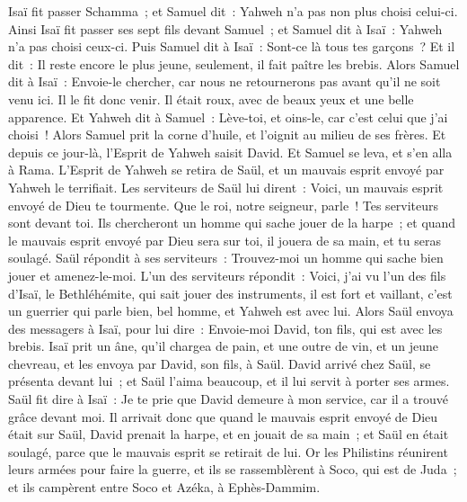 \begin{multicols}{2}
Isaï fit passer Schamma~; et Samuel dit~: Yahweh n'a pas non plus choisi celui-ci.
Ainsi Isaï fit passer ses sept fils devant Samuel~; et Samuel dit à Isaï~: Yahweh n'a pas choisi ceux-ci.
Puis Samuel dit à Isaï~: Sont-ce là tous tes garçons~? Et il dit~: Il reste encore le plus jeune, seulement, il fait paître les brebis. Alors Samuel dit à Isaï~: Envoie-le chercher, car nous ne retournerons pas avant qu'il ne soit venu ici.
Il le fit donc venir. Il était roux, avec de beaux yeux et une belle apparence. Et Yahweh dit à Samuel~: Lève-toi, et oins-le, car c'est celui que j'ai choisi~!
Alors Samuel prit la corne d'huile, et l'oignit au milieu de ses frères. Et depuis ce jour-là, l'Esprit de Yahweh saisit David. Et Samuel se leva, et s'en alla à Rama.
L'Esprit de Yahweh se retira de Saül, et un mauvais esprit envoyé par Yahweh le terrifiait.
Les serviteurs de Saül lui dirent~: Voici, un mauvais esprit envoyé de Dieu te tourmente.
Que le roi, notre seigneur, parle~! Tes serviteurs sont devant toi. Ils chercheront un homme qui sache jouer de la harpe~; et quand le mauvais esprit envoyé par Dieu sera sur toi, il jouera de sa main, et tu seras soulagé.
Saül répondit à ses serviteurs~: Trouvez-moi un homme qui sache bien jouer et amenez-le-moi.
L'un des serviteurs répondit~: Voici, j'ai vu l'un des fils d'Isaï, le Bethléhémite, qui sait jouer des instruments, il est fort et vaillant, c'est un guerrier qui parle bien, bel homme, et Yahweh est avec lui.
Alors Saül envoya des messagers à Isaï, pour lui dire~: Envoie-moi David, ton fils, qui est avec les brebis.
Isaï prit un âne, qu'il chargea de pain, et une outre de vin, et un jeune chevreau, et les envoya par David, son fils, à Saül.
David arrivé chez Saül, se présenta devant lui~; et Saül l'aima beaucoup, et il lui servit à porter ses armes.
Saül fit dire à Isaï~: Je te prie que David demeure à mon service, car il a trouvé grâce devant moi.
Il arrivait donc que quand le mauvais esprit envoyé de Dieu était sur Saül, David prenait la harpe, et en jouait de sa main~; et Saül en était soulagé, parce que le mauvais esprit se retirait de lui.
\VerseOne{}Or les Philistins réunirent leurs armées pour faire la guerre, et ils se rassemblèrent à Soco, qui est de Juda~; et ils campèrent entre Soco et Azéka, à Ephès-Dammim.

\end{multicols}
